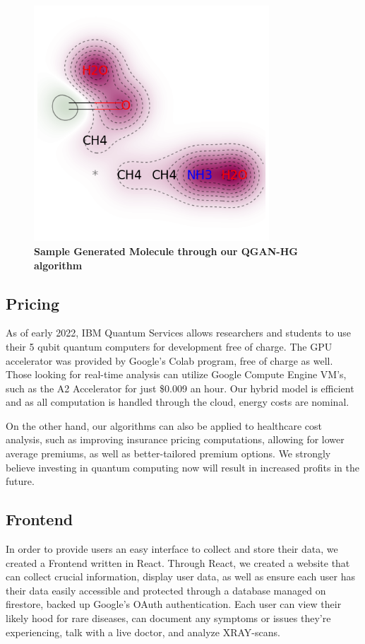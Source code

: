 \documentclass{scrartcl}
\begin{document}
\begin{figure}[htbp]
\centering
\includegraphics[width=250pt]{./assets/output4.png}
\caption{\textbf{Sample Generated Molecule through our QGAN-HG algorithm}}
\end{figure}

\subsection{Pricing}
\label{sec:org070cf00}

As of early 2022, IBM Quantum Services allows researchers and students to use their 5 qubit quantum computers for development free of charge. The GPU accelerator was provided by Google's Colab program, free of charge as well. Those looking for real-time analysis can utilize Google Compute Engine VM's, such as the A2 Accelerator for just \$0.009 an hour. Our hybrid model is efficient and as all computation is handled through the cloud, energy costs are nominal.

On the other hand, our algorithms can also be applied to healthcare cost analysis, such as improving insurance pricing computations, allowing for lower average premiums, as well as better-tailored premium options. We strongly believe investing in quantum computing now will result in increased profits in the future.

\subsection{Frontend}
\label{sec:org69d7ecf}

In order to provide users an easy interface to collect and store their data, we created a Frontend written in React. Through React, we created a website that can collect crucial information, display user data, as well as ensure each user has their data easily accessible and protected through a database managed on firestore, backed up Google's OAuth authentication. Each user can view their likely hood for rare diseases, can document any symptoms or issues they're experiencing, talk with a live doctor, and analyze XRAY-scans.
\end{document}
